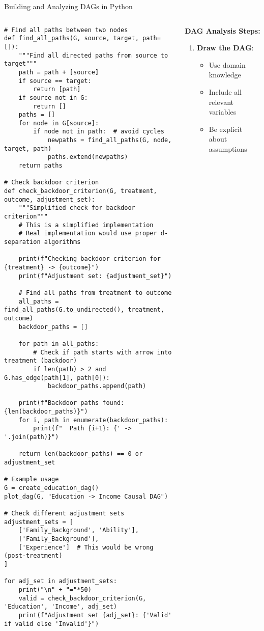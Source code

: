 \documentclass[aspectratio=169,11pt]{beamer}
\begin{document}
\begin{frame}[fragile]{Building and Analyzing DAGs in Python}
\begin{columns}
\begin{column}{0.55\textwidth}
\begin{lstlisting}[basicstyle=\ttfamily\tiny]
# Find all paths between two nodes
def find_all_paths(G, source, target, path=[]):
    """Find all directed paths from source to target"""
    path = path + [source]
    if source == target:
        return [path]
    if source not in G:
        return []
    paths = []
    for node in G[source]:
        if node not in path:  # avoid cycles
            newpaths = find_all_paths(G, node, target, path)
            paths.extend(newpaths)
    return paths

# Check backdoor criterion
def check_backdoor_criterion(G, treatment, outcome, adjustment_set):
    """Simplified check for backdoor criterion"""
    # This is a simplified implementation
    # Real implementation would use proper d-separation algorithms
    
    print(f"Checking backdoor criterion for {treatment} -> {outcome}")
    print(f"Adjustment set: {adjustment_set}")
    
    # Find all paths from treatment to outcome
    all_paths = find_all_paths(G.to_undirected(), treatment, outcome)
    backdoor_paths = []
    
    for path in all_paths:
        # Check if path starts with arrow into treatment (backdoor)
        if len(path) > 2 and G.has_edge(path[1], path[0]):
            backdoor_paths.append(path)
    
    print(f"Backdoor paths found: {len(backdoor_paths)}")
    for i, path in enumerate(backdoor_paths):
        print(f"  Path {i+1}: {' -> '.join(path)}")
    
    return len(backdoor_paths) == 0 or adjustment_set

# Example usage
G = create_education_dag()
plot_dag(G, "Education -> Income Causal DAG")

# Check different adjustment sets
adjustment_sets = [
    ['Family_Background', 'Ability'],
    ['Family_Background'],
    ['Experience']  # This would be wrong (post-treatment)
]

for adj_set in adjustment_sets:
    print("\n" + "="*50)
    valid = check_backdoor_criterion(G, 'Education', 'Income', adj_set)
    print(f"Adjustment set {adj_set}: {'Valid' if valid else 'Invalid'}")
\end{lstlisting}
\end{column}
\begin{column}{0.45\textwidth}
\textbf{DAG Analysis Steps:}

\begin{enumerate}
\item \textbf{Draw the DAG}:
   \begin{itemize}
   \item Use domain knowledge
   \item Include all relevant variables
   \item Be explicit about assumptions
   \end{itemize}


\end{enumerate}
\end{column}
\end{columns}
\end{frame}
\end{document}
